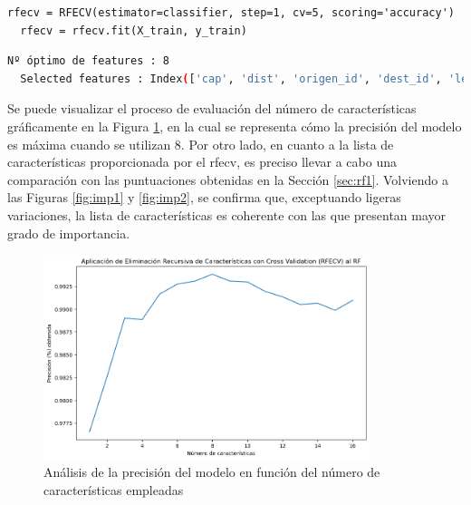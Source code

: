 \vspace{3mm}

\begin{lstlisting}[style=Python, caption={Aplicación del \acrshort{rfecv}}]
  rfecv = RFECV(estimator=classifier, step=1, cv=5, scoring='accuracy') 
  rfecv = rfecv.fit(X_train, y_train)
\end{lstlisting}

\vspace{3mm}

\begin{lstlisting}[language=bash, style=Python, caption={Resultados del \acrshort{rfecv}}]
  Nº óptimo de features : 8
  Selected features : Index(['cap', 'dist', 'origen_id', 'dest_id', 'len_origen_tag', 'len_dest_tag', 'total_balance', 'abs_flux'], dtype='object')
\end{lstlisting}

\vspace{3mm}

Se puede visualizar el proceso de evaluación del número de características gráficamente en la Figura \ref{fig:rfecv}, en la cual se representa cómo la precisión del modelo es máxima cuando se utilizan 8. Por otro lado, en cuanto a la lista de características proporcionada por el \gls{rfecv}, es preciso llevar a cabo una comparación con las puntuaciones obtenidas en la Sección \ref{sec:rf1}. Volviendo a las Figuras \ref{fig:imp1} y \ref{fig:imp2}, se confirma que, exceptuando ligeras variaciones, la lista de características es coherente con las que presentan mayor grado de importancia.

\vspace{3mm}

\begin{figure}[H]
  \centering
  \includegraphics[width=0.85\textwidth]{img/desarrollo/rf/rfecv.png}
  \caption{Análisis de la precisión del modelo en función del número de características empleadas}
  \label{fig:rfecv}
\end{figure}

